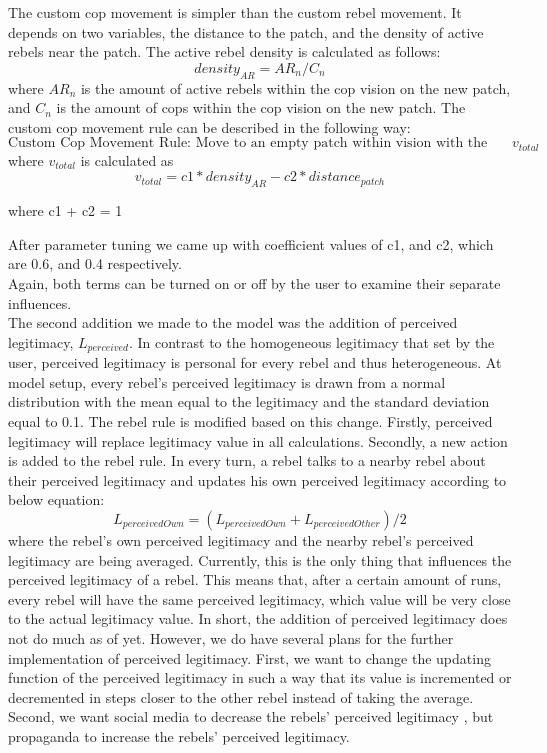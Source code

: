 \documentclass[a4paper,11pt]{article}
\begin{document}
The custom cop movement is simpler than the custom rebel movement. It depends on two variables, the distance to the patch, and the density of active rebels near the patch. The active rebel density is calculated as follows:
\[density_{AR} = AR_n/C_n\]
where $AR_n$ is the amount of active rebels within the cop vision on the new patch, and $C_n$ is the amount of cops within the cop vision on the new patch. The custom cop movement rule can be described in the following way:
\[\text{Custom Cop Movement Rule: Move to an empty patch within vision with the highest } v_{total}\]
where $v_{total}$ is calculated as
\[v_{total} = c1 * density_{AR} - c2 * distance_{patch}\]
\begin{center}
where c1 + c2 = 1
\end{center}
After parameter tuning we came up with coefficient values of c1, and c2, which are 0.6, and 0.4 respectively.
\\
Again, both terms can be turned on or off by the user to examine their separate influences. 
\\
The second addition we made to the model was the addition of perceived legitimacy, $L_{perceived}$. In contrast to the homogeneous legitimacy that set by the user, perceived legitimacy is personal for every rebel and thus heterogeneous. At model setup, every rebel's perceived legitimacy is drawn from a normal distribution with the mean equal to the legitimacy and the standard deviation equal to 0.1. The rebel rule is modified based on this change. Firstly, perceived legitimacy will replace legitimacy value in all calculations. Secondly, a new action is added to the rebel rule. In every turn, a rebel talks to a nearby rebel about their perceived legitimacy and updates his own perceived legitimacy according to below equation:
\[L_{perceivedOwn} = (L_{perceivedOwn} + L_{perceivedOther})/2\]
where the rebel's own perceived legitimacy and the nearby rebel's perceived legitimacy are being averaged. Currently, this is the only thing that influences the perceived legitimacy of a rebel. This means that, after a certain amount of runs, every rebel will have the same perceived legitimacy, which value will be very close to the actual legitimacy value. In short, the addition of perceived legitimacy does not do much as of yet. However, we do have several plans for the further implementation of perceived legitimacy. First, we want to change the updating function of the perceived legitimacy in such a way that its value is incremented or decremented in steps closer to the other rebel instead of taking the average. Second, we want social media to decrease the rebels' perceived legitimacy \cite{Breuer_2016}, but propaganda to increase the rebels' perceived legitimacy.
\end{document}
